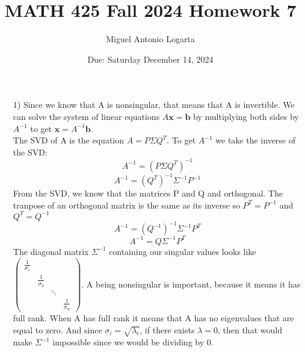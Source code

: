 \documentclass{article}
\title{MATH 425 Fall 2024 Homework 7}
\date{Due: Saturday December 14, 2024}
\author{Miguel Antonio Logarta}
\begin{document}
\maketitle  %
\thispagestyle{fancy}

\begin{enumerate}
    \item[1)] Since we know that A is nonsingular, that means that A is invertible. We can solve the system of linear equations $A\textbf{x} = \textbf{b}$ by multiplying both sides by $A^{-1}$ to get $\textbf{x} = A^{-1} \textbf{b}$. \\
            The SVD of A is the equation $A = P\Sigma Q^T$. To get $A^{-1}$ we take the inverse of the SVD:
            $$A^{-1} = (P \Sigma Q^T)^{-1}$$ 
            $$A^{-1} = (Q^T)^{-1} \Sigma^{-1} P^{-1}$$ 
            From the SVD, we know that the matrices P and Q and orthogonal. The tranpose of an orthogonal matrix is the same as its inverse so $P^T = P^{-1}$ and $Q^T = Q^{-1}$
            $$A^{-1} = (Q^{-1})^{-1} \Sigma^{-1} P^T$$ 
            $$A^{-1} = Q \Sigma^{-1} P^T$$ 
            The diagonal matrix $\Sigma^{-1}$ containing our singular values looks like $\begin{pmatrix}
                \frac{1}{\sigma_1} & & & \\
                & \frac{1}{\sigma_2} & &  \\
                & & \ddots & \\
                & & & \frac{1}{\sigma_n}
            \end{pmatrix}$. A being nonsingular is important, because it means it has full rank. When A has full rank it means that A has no eigenvalues that are equal to zero. And since $\sigma_i = \sqrt{\lambda_i}$, if there exists $\lambda = 0$, then that would make $\Sigma^{-1}$ impossible since we would be dividing by 0. 


\end{enumerate}
\end{document}
